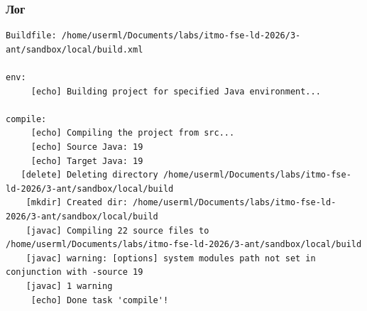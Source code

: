\subsubsection{Лог}

\begin{lstlisting}[caption={Лог цели \texttt{env}},language={},captionpos=b]
Buildfile: /home/userml/Documents/labs/itmo-fse-ld-2026/3-ant/sandbox/local/build.xml

env:
     [echo] Building project for specified Java environment...

compile:
     [echo] Compiling the project from src...
     [echo] Source Java: 19
     [echo] Target Java: 19
   [delete] Deleting directory /home/userml/Documents/labs/itmo-fse-ld-2026/3-ant/sandbox/local/build
    [mkdir] Created dir: /home/userml/Documents/labs/itmo-fse-ld-2026/3-ant/sandbox/local/build
    [javac] Compiling 22 source files to /home/userml/Documents/labs/itmo-fse-ld-2026/3-ant/sandbox/local/build
    [javac] warning: [options] system modules path not set in conjunction with -source 19
    [javac] 1 warning
     [echo] Done task 'compile'!


\end{lstlisting}
